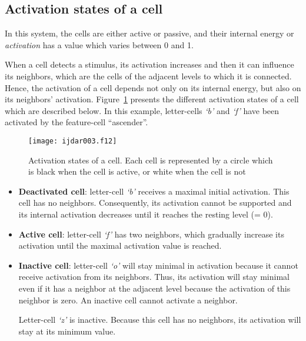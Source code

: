 \documentclass[ijdar]{svjour}
\begin{document}
\subsection{Activation states of a cell}

In this system, the cells are either active or passive, and their internal energy or {\it activation} has a value which varies between 0 and 1.

When a cell detects a stimulus, its activation increases and then it can influence its neighbors, which are the cells of the adjacent levels to which it is connected.
Hence, the activation of a cell depends not only on its internal energy, but also on its neighbors' activation.
Figure~\ref{FIGACT} presents the different activation states of a cell which are described below.
In this example, letter-cells {\it `b'} and {\it `f'} have been activated by the feature-cell ``ascender''.

\begin{figure}%
\texttt{[image: ijdar003.f12]}%
\caption{Activation states of a cell. Each cell is represented by a
circle which is black when the cell is active, or white when the cell is
not}
\label{FIGACT}
\end{figure}


\begin{itemize}

\item {\bf Deactivated cell}: letter-cell {\it `b'} receives a maximal initial activation.
This cell has no neighbors.
Consequently, its activation cannot be supported and its internal activation decreases until it reaches the resting level (= 0).

\item {\bf Active cell}:  letter-cell {\it `f'} has two neighbors, which gradually increase its activation until the maximal activation value is reached.

\item {\bf Inactive cell}: letter-cell {\it `o'} will stay minimal in activation because it cannot receive activation from its neighbors.
Thus, its activation will stay minimal even if it has a neighbor at the adjacent level because the activation of this neighbor is zero.
An inactive cell cannot activate a neighbor.

Letter-cell {\it `z'} is inactive.
Because this cell has no neighbors, its activation will stay at its minimum value.

\end{itemize}
\end{document}
